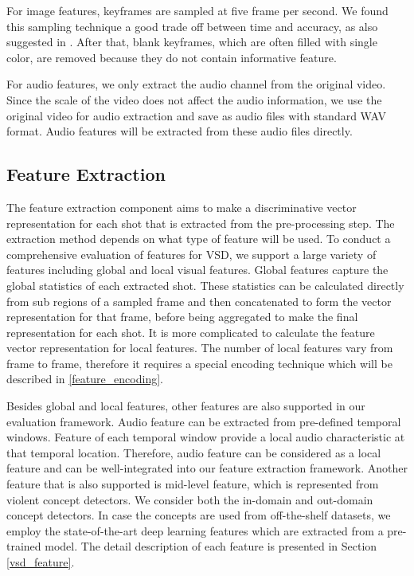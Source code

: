 \documentclass[review]{elsarticle}
\begin{document}
For image features, keyframes are sampled at five frame per second. We found this sampling technique a good trade off between time and accuracy, as also suggested in \cite{merler2012semantic}. After that, blank keyframes, which are often filled with single color, are removed because they do not contain informative feature.

For audio features, we only extract the audio channel from the original video. Since the scale of the video does not affect the audio information, we use the original video for audio extraction and save as audio files with standard WAV format. Audio features will be extracted from these audio files directly.

\subsection{Feature Extraction}
The feature extraction component aims to make a discriminative vector representation for each shot that is extracted from the pre-processing step. The extraction method depends on what type of feature will be used. To conduct a comprehensive evaluation of features for VSD, we support a large variety of features including global and local visual features. Global features capture the global statistics of each extracted shot. These statistics can be calculated directly from sub regions of a sampled frame and then concatenated to form the vector representation for that frame, before being aggregated to make the final representation for each shot. It is more complicated to calculate the feature vector representation for local features. The number of local features vary from frame to frame, therefore it requires a special encoding technique which will be described in \ref{feature_encoding}.

Besides global and local features, other features are also supported in our evaluation framework. Audio feature can be extracted from pre-defined temporal windows. Feature of each temporal window provide a local audio characteristic at that temporal location. Therefore, audio feature can be considered as a local feature and can be well-integrated into our feature extraction framework. Another feature that is also supported is mid-level feature, which is represented from violent concept detectors. We consider both the in-domain and out-domain concept detectors. In case the concepts are used from off-the-shelf datasets, we employ the state-of-the-art deep learning features which are extracted from a pre-trained model. The detail description of each feature is presented in Section \ref{vsd_feature}.
\end{document}
